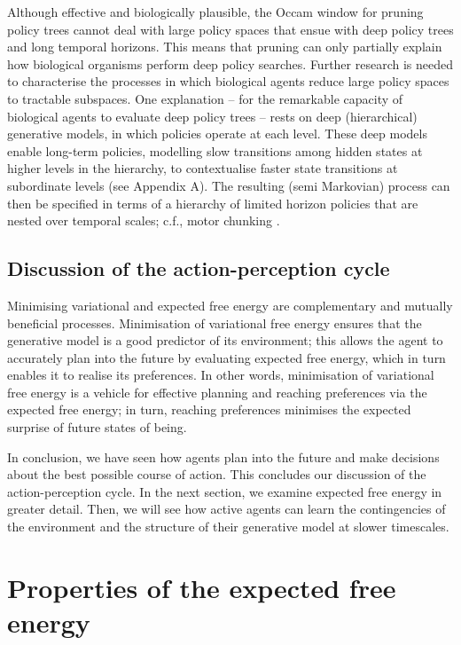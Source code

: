 \documentclass[review,12pt,authoryear]{elsarticle}
\begin{document}
Although effective and biologically plausible, the Occam window for pruning policy trees cannot deal with large policy spaces that ensue with deep policy trees and long temporal horizons. This means that pruning can only partially explain how biological organisms perform deep policy searches. Further research is needed to characterise the processes in which biological agents reduce large policy spaces to tractable subspaces. One explanation -- for the remarkable capacity of biological agents to evaluate deep policy trees -- rests on deep (hierarchical) generative models, in which policies operate at each level. These deep models enable long-term policies, modelling slow transitions among hidden states at higher levels in the hierarchy, to contextualise faster state transitions at subordinate levels (see Appendix A). The resulting (semi Markovian) process can then be specified in terms of a hierarchy of limited horizon policies that are nested over temporal scales; c.f., motor chunking \citep{dehaeneNeuralRepresentationSequences2015,fonollosaLearningChunkingSequences2015,harunoHierarchicalMOSAICMovement2003}.

\subsection{Discussion of the action-perception cycle}

Minimising variational and expected free energy are complementary and mutually beneficial processes. Minimisation of variational free energy ensures that the generative model is a good predictor of its environment; this allows the agent to accurately plan into the future by evaluating expected free energy, which in turn enables it to realise its preferences. In other words, minimisation of variational free energy is a vehicle for effective planning and reaching preferences via the expected free energy; in turn, reaching preferences minimises the expected surprise of future states of being.

In conclusion, we have seen how agents plan into the future and make decisions about the best possible course of action. This concludes our discussion of the action-perception cycle. In the next section, we examine expected free energy in greater detail. Then, we will see how active agents can learn the contingencies of the environment and the structure of their generative model at slower timescales.



\section{Properties of the expected free energy}
\label{sec: efe}
\end{document}
